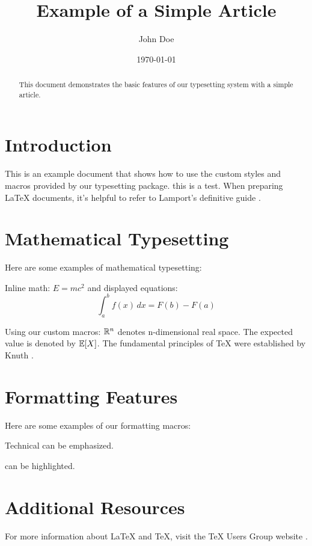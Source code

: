 \documentclass{article}
\title{Example of a Simple Article}
\author{John Doe}
\date{\today}
\begin{document}
\maketitle

\begin{abstract}
  This document demonstrates the basic features of our typesetting system with a simple article.
\end{abstract}

\section{Introduction}
This is an example document that shows how to use the custom styles and macros provided by our typesetting package.
this is a test. When preparing LaTeX documents, it's helpful to refer to Lamport's definitive guide \cite{lamport1994latex}.

\section{Mathematical Typesetting}
Here are some examples of mathematical typesetting:

Inline math: $E = mc^2$ and displayed equations:
\begin{equation}
  \int_{a}^{b} f(x) \, dx = F(b) - F(a)
\end{equation}

Using our custom macros: $\mathbb{R}^n$ denotes n-dimensional real space. The expected value is denoted by $\mathbb{E}[X]$.
The fundamental principles of TeX were established by Knuth \cite{knuth1984texbook}.

\section{Formatting Features}
Here are some examples of our formatting macros:

Technical  can be emphasized.

 can be highlighted.


\section{Additional Resources}
For more information about LaTeX and TeX, visit the TeX Users Group website \cite{texusersgroup}.



\end{document}
